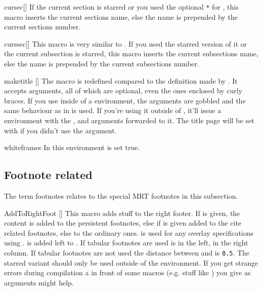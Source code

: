 \begin{describemacro}{cursec}[\meta{*}]
  If the current section is starred or you used the optional \texttt{*} for
  , this macro inserts the current sections name, else the name is
  prepended by the current sections number.
\end{describemacro}

\begin{describemacro}{curssec}[\meta{*}]
  This macro is very similar to . If you used the starred version of
  it or the current subsection is starred, this macro inserts the current
  subsections name, else the name is prepended by the current subsections
  number.
\end{describemacro}

\begin{describemacro}{maketitle}
  []
  The  macro is redefined compared to the definition made by
  . It accepts arguments, all of which are optional, even the ones
  enclosed by curly braces. If you use  inside of a 
  environment, the arguments are gobbled and the same behaviour as in
   is used. If you're using it outside of , it'll issue a
   environment with the ,  and
   arguments forwarded to it. The title page will be set with
   if you didn't use the  argument.
\end{describemacro}

\begin{describeenv}{whiteframes}
  In this environment  is set true.
\end{describeenv}

\subsection{Footnote related}\label{sec:beam:macros:foot}
The term footnotes relates to the special MRT footnotes in this subsection.
\begin{describemacro}{AddToRightFoot}%
  [\meta{*}\meta{+}]
  This macro adds stuff to the right footer. If \meta{*} is given, the content
  is added to the persistent footnotes, else if \meta{+} is given added to the
  cite related footnotes, else to the ordinary ones.  is used for
  any overlay specifications using .  is added left to
  . If tabular footnotes are used  is in the left,
   in the right column. If tabular footnotes are not used the
  distance between  and  is \texttt{0.5}. The
  starred variant should only be used outside of the  environment. If
  you get strange errors during compilation a  in front of some
  macros (e.g. stuff like ) you give as arguments might help.
\end{describemacro}

